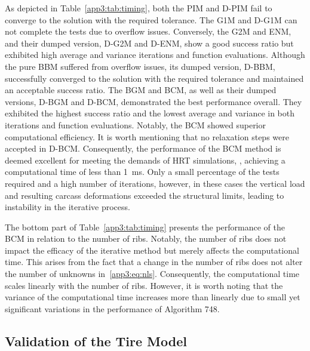 As depicted in Table~\ref{app3:tab:timing}, both the PIM and D-PIM fail to converge to the solution with the required tolerance. The G1M and D-G1M can not complete the tests due to overflow issues. Conversely, the G2M and ENM, and their dumped version, D-G2M and D-ENM, show a good success ratio but exhibited high average and variance iterations and function evaluations. Although the pure BBM suffered from overflow issues, its dumped version, D-BBM, successfully converged to the solution with the required tolerance and maintained an acceptable success ratio. The BGM and BCM, as well as their dumped versions, D-BGM and D-BCM, demonstrated the best performance overall. They exhibited the highest success ratio and the lowest average and variance in both iterations and function evaluations. Notably, the BCM showed superior computational efficiency. It is worth mentioning that no relaxation steps were accepted in D-BCM. Consequently, the performance of the BCM method is deemed excellent for meeting the demands of \ac{HRT} simulations, \ie{}, achieving a computational time of less than \SI{1}{\milli\second}. Only a small percentage of the tests required and a high number of iterations, however, in these cases the vertical load and resulting carcass deformations exceeded the structural limits, leading to instability in the iterative process.

The bottom part of Table~\ref{app3:tab:timing} presents the performance of the BCM in relation to the number of ribs. Notably, the number of ribs does not impact the efficacy of the iterative method but merely affects the computational time. This arises from the fact that a change in the number of ribs does not alter the number of unknowns in~\eqref{app3:eq:nls}. Consequently, the computational time scales linearly with the number of ribs. However, it is worth noting that the variance of the computational time increases more than linearly due to small yet significant variations in the performance of Algorithm 748.

\subsection{Validation of the Tire Model}

